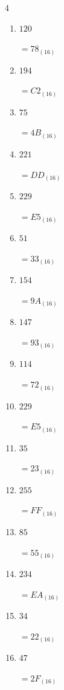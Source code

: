 \begin{multicols}{4}
\begin{enumerate}
  \item $120$

        $=78_{(16)}$

  \item $194$

        $=C2_{(16)}$

  \item $75$

        $=4B_{(16)}$

  \item $221$

        $=DD_{(16)}$

  \item $229$

        $=E5_{(16)}$

  \item $51$

        $=33_{(16)}$

  \item $154$

        $=9A_{(16)}$

  \item $147$

        $=93_{(16)}$

  \item $114$

        $=72_{(16)}$

  \item $229$

        $=E5_{(16)}$

  \item $35$

        $=23_{(16)}$

  \item $255$

        $=FF_{(16)}$

\columnbreak %

\resetques

  \item $85$

        $=55_{(16)}$

  \item $234$

        $=EA_{(16)}$

  \item $34$

        $=22_{(16)}$

  \item $47$

        $=2F_{(16)}$


\end{enumerate}
\end{multicols}
